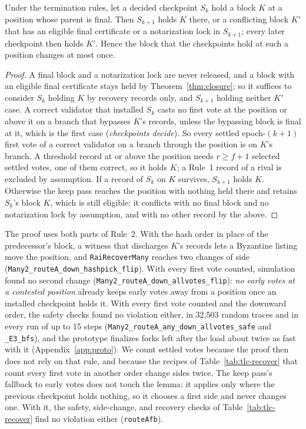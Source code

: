 \documentclass[conference]{IEEEtran}
\begin{document}
\begin{lemma}
\label{lem:flip}
Under the termination rules, let a decided checkpoint $S_k$ hold a block $K$ at a position whose parent is final. Then $S_{k+1}$ holds $K$ there, or a conflicting block $K'$ that has an eligible final certificate or a notarization lock in $S_{k+1}$; every later checkpoint then holds $K'$. Hence the block that the checkpoints hold at such a position changes at most once.
\end{lemma}
\begin{proof}
A final block and a notarization lock are never released, and a block with an eligible final certificate stays held by Theorem~\ref{thm:closure}; so it suffices to consider $S_k$ holding $K$ by recovery records only, and $S_{k+1}$ holding neither $K'$ case. A correct validator that installed $S_k$ casts no first vote at the position or above it on a branch that bypasses $K$'s records, unless the bypassing block is final at it, which is the first case (\emph{checkpoints decide}). So every settled epoch-$(k+1)$ first vote of a correct validator on a branch through the position is on $K$'s branch. A threshold record at or above the position needs $r\ge f+1$ selected settled votes, one of them correct, so it holds $K$; a Rule~1 record of a rival is excluded by assumption. If a record of $S_k$ on $K$ survives, $S_{k+1}$ holds $K$. Otherwise the keep pass reaches the position with nothing held there and retains $S_k$'s block $K$, which is still eligible: it conflicts with no final block and no notarization lock by assumption, and with no other record by the above.
\end{proof}
The proof uses both parts of Rule~2. With the hash order in place of the predecessor's block, a witness that discharges $K$'s records lets a Byzantine listing move the position, and \texttt{RaiRecoverMany} reaches two changes of side (\texttt{Many2\_routeA\_down\_hashpick\_flip}). With every first vote counted, simulation found no second change (\texttt{Many2\_routeA\_down\_allvotes\_flip}): \emph{no early votes at a contested position} already keeps early votes away from a position once an installed checkpoint holds it. With every first vote counted and the downward order, the safety checks found no violation either, in 32{,}503 random traces and in every run of up to 15 steps (\texttt{Many2\_routeA\_any\_down\_allvotes\_safe} and \texttt{\_E3\_bfs}), and the prototype finalizes forks left after the load about twice as fast with it (Appendix~\ref{app:proto}). We count settled votes because the proof then does not rely on that rule, and because the recipes of Table~\ref{tab:tlc-recover} that count every first vote in another order change sides twice. The keep pass's fallback to early votes does not touch the lemma: it applies only where the previous checkpoint holds nothing, so it chooses a first side and never changes one. With it, the safety, side-change, and recovery checks of Table~\ref{tab:tlc-recover} find no violation either (\texttt{routeAfb}).
\end{document}
